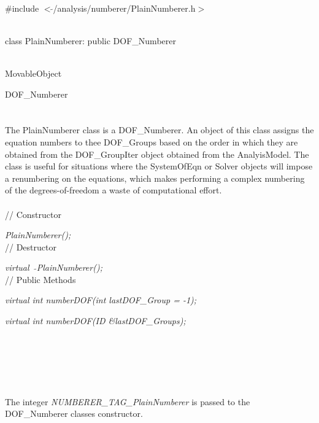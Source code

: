 
   \\
\#include $<\tilde{ }$/analysis/numberer/PlainNumberer.h$>$  


  \\
class PlainNumberer: public DOF\_Numberer  


 \\
MovableObject 

\indent\indent DOF\_Numberer \\
\indent\indent{} \\

 \\ 
\indent The PlainNumberer class is a DOF\_Numberer. An object of this
class assigns the equation numbers to thee DOF\_Groups based on the
order in which they are obtained from the DOF\_GroupIter object
obtained from the AnalyisModel. The class is useful for situations
where the SystemOfEqn or Solver objects will impose a renumbering on
the equations, which makes performing a complex numbering of the
degrees-of-freedom a waste of computational effort. \\


 \\
// Constructor 

{\em PlainNumberer();}\\ 

// Destructor 

{\em virtual~ $\tilde{}$PlainNumberer();}\\  

// Public Methods 

{\em virtual int numberDOF(int lastDOF\_Group = -1);} 

{\em virtual int numberDOF(ID \&lastDOF\_Groups);} 

\\ 
\\ \\


 \\
\\ 
The integer {\em NUMBERER\_TAG\_PlainNumberer} is passed to the
DOF\_Numberer classes constructor. \\

